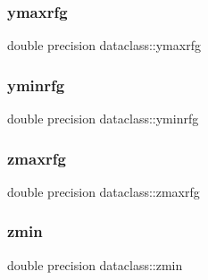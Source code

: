 \subsubsection{\texorpdfstring{ymaxrfg}{ymaxrfg}}
{\footnotesize\ttfamily double precision dataclass\+::ymaxrfg}

\mbox{\label{group__name_ga5393ad3032e6f0311c62d03d468a6cf0}} 
\subsubsection{\texorpdfstring{yminrfg}{yminrfg}}
{\footnotesize\ttfamily double precision dataclass\+::yminrfg}

\mbox{\label{group__name_ga52b6a1ee39c205fce4ef2be72ab153aa}} 
\subsubsection{\texorpdfstring{zmaxrfg}{zmaxrfg}}
{\footnotesize\ttfamily double precision dataclass\+::zmaxrfg}

\mbox{\label{group__name_ga9c2398fd87701d5c0de37ff6b3357a0c}} 
\subsubsection{\texorpdfstring{zmin}{zmin}}
{\footnotesize\ttfamily double precision dataclass\+::zmin}

